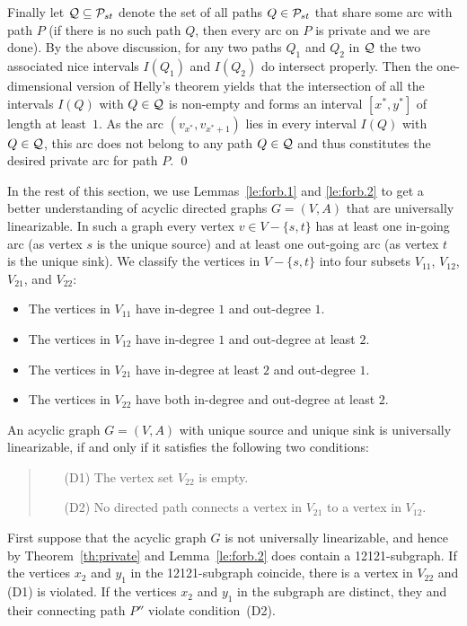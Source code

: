 \documentclass[11pt,fleqn]{article}
\begin{document}
Finally let ${\cal Q}\subseteq{\cal P}_{st}$ denote the set of all paths $Q\in{\cal P}_{st}$ that share some arc with path $P$
(if there is no such path $Q$, then every arc on $P$ is private and we are done).
By the above discussion, for any two paths $Q_1$ and $Q_2$ in ${\cal Q}$ the two associated nice 
intervals $I(Q_1)$ and $I(Q_2)$ do intersect properly.
Then the one-dimensional version of Helly's theorem \cite{Helly1923} yields that the intersection of all the 
intervals $I(Q)$ with $Q\in{\cal Q}$ is non-empty and forms an interval $[x^*,y^*]$ of length at least~$1$.
As the arc $(v_{x^*},v_{x^*+1})$ lies in every interval $I(Q)$ with $Q\in{\cal Q}$, this arc does 
not belong to any path $Q\in{\cal Q}$ and thus constitutes the desired private arc for path $P$.
\qed

\bigskip
In the rest of this section, we use Lemmas~\ref{le:forb.1} and \ref{le:forb.2} to get a better 
understanding of acyclic directed graphs $G=(V,A)$ that are universally linearizable.
In such a graph every vertex $v\in V-\{s,t\}$ has at least one in-going arc (as vertex $s$ is the 
unique source) and at least one out-going arc (as vertex $t$ is the unique sink).
We classify the vertices in $V-\{s,t\}$ into four subsets $V_{11}$, $V_{12}$, $V_{21}$, and $V_{22}$:
\begin{itemize}
\item The vertices in $V_{11}$ have in-degree $1$ and out-degree $1$.
\item The vertices in $V_{12}$ have in-degree $1$ and out-degree at least $2$.
\item The vertices in $V_{21}$ have in-degree at least $2$ and out-degree $1$.
\item The vertices in $V_{22}$ have both in-degree and out-degree at least $2$.
\end{itemize}
\begin{lemma}
\label{le:D1D2}
An acyclic graph $G=(V,A)$ with unique source and unique sink is universally linearizable, 
if and only if it satisfies the following two conditions:
\begin{quote}
\begin{itemize}
\item[(D1)] The vertex set $V_{22}$ is empty.
\item[(D2)] No directed path connects a vertex in $V_{21}$ to a vertex in $V_{12}$.
\end{itemize}
\end{quote}
\end{lemma}
\proof
First suppose that the acyclic graph $G$ is not universally linearizable, and hence 
by Theorem~\ref{th:private} and Lemma~\ref{le:forb.2} does contain a 12121-subgraph.
If the vertices $x_2$ and $y_1$ in the 12121-subgraph coincide, there is a vertex in $V_{22}$
and (D1) is violated.
If the vertices $x_2$ and $y_1$ in the subgraph are distinct, they and their connecting
path $P''$ violate condition~(D2).
\end{document}
